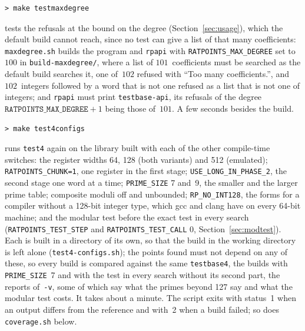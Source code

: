 \documentclass[12pt,a4paper,oneside]{amsart}
\begin{document}
\begin{verbatim}
> make testmaxdegree
\end{verbatim}
tests the refusals at the bound on the degree (Section~\ref{sec:usage}),
which the default build cannot reach, since no test can give a list of
that many coefficients: \texttt{maxdegree.sh} builds the program and
\texttt{rpapi} with \texttt{RATPOINTS\_MAX\_DEGREE} set to~$100$ in
\texttt{build-maxdegree/}, where a list of $101$~coefficients must be
searched as the default build searches it, one of~$102$ refused with ``Too
many coefficients.'', and $102$~integers followed by a word that is not one
refused as a list that is not one of integers; and \texttt{rpapi} must
print \texttt{testbase-api}, its refusals of the degree
$\texttt{RATPOINTS\_MAX\_DEGREE} + 1$ being those of~$101$. A few seconds
besides the build.

\begin{verbatim}
> make test4configs
\end{verbatim}
runs \texttt{test4} again on the library built with each of the other
compile-time switches: the register widths 64, 128 (both variants) and
512 (emulated); \texttt{RATPOINTS\_CHUNK=1}, one register in the first
stage; \texttt{USE\_LONG\_IN\_PHASE\_2}, the second stage one word at a
time; \texttt{PRIME\_SIZE} 7 and~9, the smaller and the larger prime table;
composite moduli off and unbounded; \texttt{RP\_NO\_INT128}, the forms
for a compiler without a 128-bit integer type, which gcc and clang have on
every 64-bit machine; and the modular test before the exact test in every
search (\texttt{RATPOINTS\_TEST\_STEP} and \texttt{RATPOINTS\_TEST\_CALL}
0, Section~\ref{sec:modtest}).  Each is
built in a directory of its own, so that the build in the working
directory is left alone (\texttt{test4-configs.sh}); the points found
must not depend on any of these, so every build is compared against the
same \texttt{testbase4}, the builds with \texttt{PRIME\_SIZE}~7 and with
the test in every search without its second part, the reports
of~\verb+-v+, some of which say what the primes beyond 127 say and what
the modular test costs. It takes about a minute.
The script exits with status~1 when an output
differs from the reference and with~2 when a build failed; so does
\texttt{coverage.sh} below.
\end{document}
